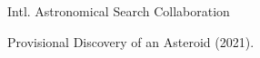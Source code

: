 \entryItem
	{Intl. Astronomical Search Collaboration}
	{}

	\begin{items}
		\item Provisional Discovery of an Asteroid (2021).
	\end{items}
